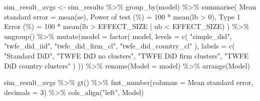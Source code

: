 \documentclass[
  letterpaper,
  DIV=11,
  numbers=noendperiod]{scrartcl}
\newenvironment{Shaded}{\begin{snugshade}}{\end{snugshade}}
\newcommand{\AttributeTok}[1]{\textcolor[rgb]{0.40,0.45,0.13}{#1}}
\newcommand{\DecValTok}[1]{\textcolor[rgb]{0.68,0.00,0.00}{#1}}
\newcommand{\FunctionTok}[1]{\textcolor[rgb]{0.28,0.35,0.67}{#1}}
\newcommand{\NormalTok}[1]{\textcolor[rgb]{0.00,0.23,0.31}{#1}}
\newcommand{\OtherTok}[1]{\textcolor[rgb]{0.00,0.23,0.31}{#1}}
\newcommand{\SpecialCharTok}[1]{\textcolor[rgb]{0.37,0.37,0.37}{#1}}
\newcommand{\StringTok}[1]{\textcolor[rgb]{0.13,0.47,0.30}{#1}}
\begin{document}
\begin{Shaded}
\begin{Highlighting}[]
\NormalTok{sim\_result\_avgs }\OtherTok{\textless{}{-}}\NormalTok{ sim\_results }\SpecialCharTok{\%\textgreater{}\%} \FunctionTok{group\_by}\NormalTok{(model) }\SpecialCharTok{\%\textgreater{}\%} \FunctionTok{summarise}\NormalTok{(}
    \StringTok{\textasciigrave{}}\AttributeTok{Mean standard error}\StringTok{\textasciigrave{}} \OtherTok{=} \FunctionTok{mean}\NormalTok{(se),}
    \StringTok{\textasciigrave{}}\AttributeTok{Power of test (\%)}\StringTok{\textasciigrave{}} \OtherTok{=} \DecValTok{100} \SpecialCharTok{*} \FunctionTok{mean}\NormalTok{(lb }\SpecialCharTok{\textgreater{}} \DecValTok{0}\NormalTok{),}
    \StringTok{\textasciigrave{}}\AttributeTok{Type 1 Error (\%)}\StringTok{\textasciigrave{}} \OtherTok{=} \DecValTok{100} \SpecialCharTok{*} \FunctionTok{mean}\NormalTok{(lb }\SpecialCharTok{\textgreater{}}\NormalTok{ EFFECT\_SIZE }\SpecialCharTok{|}\NormalTok{ ub }\SpecialCharTok{\textless{}}\NormalTok{ EFFECT\_SIZE)}
\NormalTok{) }\SpecialCharTok{\%\textgreater{}\%} 
    \FunctionTok{ungroup}\NormalTok{() }\SpecialCharTok{\%\textgreater{}\%}
    \FunctionTok{mutate}\NormalTok{(}\AttributeTok{model =} \FunctionTok{factor}\NormalTok{(}
\NormalTok{        model, }
        \AttributeTok{levels =} \FunctionTok{c}\NormalTok{(}
            \StringTok{"simple\_did"}\NormalTok{, }\StringTok{"twfe\_did\_iid"}\NormalTok{, }
            \StringTok{"twfe\_did\_firm\_cl"}\NormalTok{, }\StringTok{"twfe\_did\_country\_cl"}
\NormalTok{        ),}
        \AttributeTok{labels =} \FunctionTok{c}\NormalTok{(}
            \StringTok{"Standard DiD"}\NormalTok{, }\StringTok{"TWFE DiD no clusters"}\NormalTok{, }
            \StringTok{"TWFE DiD firm clusters"}\NormalTok{, }\StringTok{"TWFE DiD country clusters"}
\NormalTok{        )}
\NormalTok{    )) }\SpecialCharTok{\%\textgreater{}\%}
    \FunctionTok{rename}\NormalTok{(}\AttributeTok{Model =}\NormalTok{ model) }\SpecialCharTok{\%\textgreater{}\%}
    \FunctionTok{arrange}\NormalTok{(Model)}

\NormalTok{sim\_result\_avgs }\SpecialCharTok{\%\textgreater{}\%} \FunctionTok{gt}\NormalTok{() }\SpecialCharTok{\%\textgreater{}\%} 
    \FunctionTok{fmt\_number}\NormalTok{(}\AttributeTok{columns =} \StringTok{\textasciigrave{}}\AttributeTok{Mean standard error}\StringTok{\textasciigrave{}}\NormalTok{, }\AttributeTok{decimals =} \DecValTok{3}\NormalTok{) }\SpecialCharTok{\%\textgreater{}\%}
    \FunctionTok{cols\_align}\NormalTok{(}\StringTok{"left"}\NormalTok{, Model)}
\end{Highlighting}
\end{Shaded}
\end{document}
